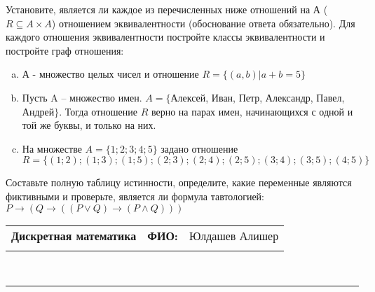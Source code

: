 \documentclass[10pt]{exam}
\newcommand{\class}{Дискретная математика}
\newcommand{\examdate}{}
\begin{document}
\begin{questions}
\question
Установите, является ли каждое из перечисленных ниже отношений на А ($R \subseteq A \times A$) отношением эквивалентности (обоснование ответа обязательно). Для каждого отношения эквивалентности постройте классы 
эквивалентности и постройте граф отношения:
\begin{enumerate} [a)]\setcounter{enumi}{0}
\item А - множество целых чисел и отношение $R = \{(a,b)|a + b = 5\}$
\item Пусть A – множество имен. $A = \{ $Алексей, Иван, Петр, Александр, Павел, Андрей$ \}$. Тогда отношение $R $ верно на парах имен, начинающихся с одной и той же буквы, и только на них.
\item На множестве $A = \{1; 2; 3; 4; 5\}$ задано отношение $R = \{(1; 2); (1; 3); (1; 5); (2; 3); (2; 4); (2; 5); (3; 4); (3; 5); (4; 5)\}$
\end{enumerate}\question Составьте полную таблицу истинности, определите, какие переменные являются фиктивными и проверьте, является ли формула тавтологией:
$ P \rightarrow (Q \rightarrow ((P \lor Q) \rightarrow (P \land Q)))$

\end{questions}
\newpage
\begin{flushright}
\begin{tabular}{p{2.8in} r l}
\textbf{\class} & \textbf{ФИО:} &Юлдашев Алишер\\

\textbf{\examdate} &&\\
\end{tabular}\\
\end{flushright}
\rule[1ex]{\textwidth}{.1pt}
\end{document}

